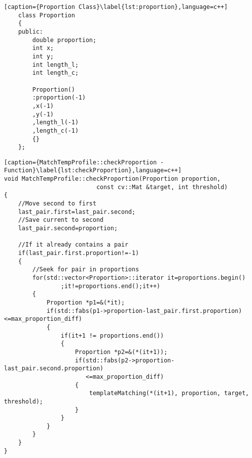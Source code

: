 \newpage
\begin{lstlisting}[caption={Proportion Class}\label{lst:proportion},language=c++]
	class Proportion
	{
	public:
		double proportion;
		int x;
		int y;
		int length_l;
		int length_c;
	
		Proportion()
		:proportion(-1)
		,x(-1)
		,y(-1)
		,length_l(-1)
		,length_c(-1)
		{}
	};
\end{lstlisting}

\newpage
\begin{lstlisting}[caption={MatchTempProfile::checkProportion - Function}\label{lst:checkProportion},language=c++]
void MatchTempProfile::checkProportion(Proportion proportion, 
                          const cv::Mat &target, int threshold)
{
	//Move second to first
	last_pair.first=last_pair.second;
	//Save current to second
	last_pair.second=proportion;

	//If it already contains a pair
	if(last_pair.first.proportion!=-1)
	{
		//Seek for pair in proportions
		for(std::vector<Proportion>::iterator it=proportions.begin()
				;it!=proportions.end();it++)
		{
			Proportion *p1=&(*it);
			if(std::fabs(p1->proportion-last_pair.first.proportion)<=max_proportion_diff)
			{
				if(it+1 != proportions.end())
				{
					Proportion *p2=&(*(it+1));
					if(std::fabs(p2->proportion-last_pair.second.proportion)
					   <=max_proportion_diff)
					{
						templateMatching(*(it+1), proportion, target, threshold);
					}
				}
			}
		}
	}
}
\end{lstlisting}

